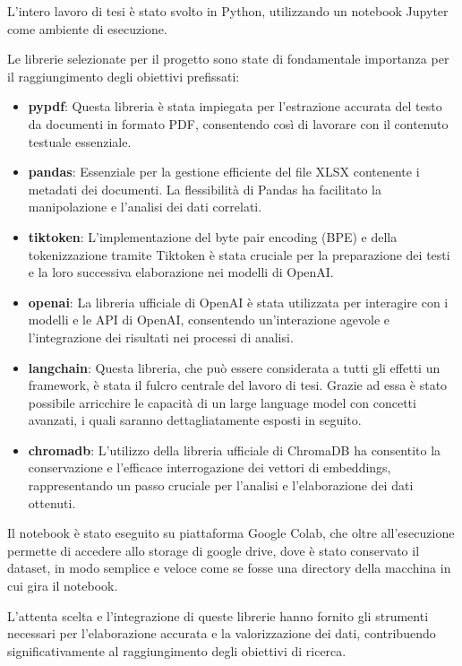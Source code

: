 L'intero lavoro di tesi è stato svolto in Python\cite{python}, utilizzando un notebook Jupyter\cite{jupyter} come ambiente di esecuzione.

Le librerie selezionate per il progetto sono state di fondamentale importanza per il raggiungimento degli obiettivi prefissati:
\begin{itemize}
    \item \textbf{pypdf}: Questa libreria è stata impiegata per l'estrazione accurata del testo da documenti in formato PDF, consentendo così di lavorare con il contenuto testuale essenziale.
    \item \textbf{pandas}: Essenziale per la gestione efficiente del file XLSX contenente i metadati dei documenti. La flessibilità di Pandas ha facilitato la manipolazione e l'analisi dei dati correlati.
    \item \textbf{tiktoken}: L'implementazione del byte pair encoding (BPE) e della tokenizzazione tramite Tiktoken è stata cruciale per la preparazione dei testi e la loro successiva elaborazione nei modelli di OpenAI.
    \item \textbf{openai}: La libreria ufficiale di OpenAI è stata utilizzata per interagire con i modelli e le API di OpenAI, consentendo un'interazione agevole e l'integrazione dei risultati nei processi di analisi.
    \item \textbf{langchain}: Questa libreria, che può essere considerata a tutti gli effetti un framework, è stata il fulcro centrale del lavoro di tesi. Grazie ad essa è stato possibile arricchire le capacità di un large language model con concetti avanzati, i quali saranno dettagliatamente esposti in seguito.
    \item \textbf{chromadb}: L'utilizzo della libreria ufficiale di ChromaDB ha consentito la conservazione e l'efficace interrogazione dei vettori di embeddings, rappresentando un passo cruciale per l'analisi e l'elaborazione dei dati ottenuti.
\end{itemize}

Il notebook è stato eseguito su piattaforma Google Colab, che oltre all'esecuzione permette di accedere allo storage di google drive, dove è stato conservato il dataset, in modo semplice e veloce come se fosse una directory della macchina in cui gira il notebook.

L'attenta scelta e l'integrazione di queste librerie hanno fornito gli strumenti necessari per l'elaborazione accurata e la valorizzazione dei dati, contribuendo significativamente al raggiungimento degli obiettivi di ricerca.

